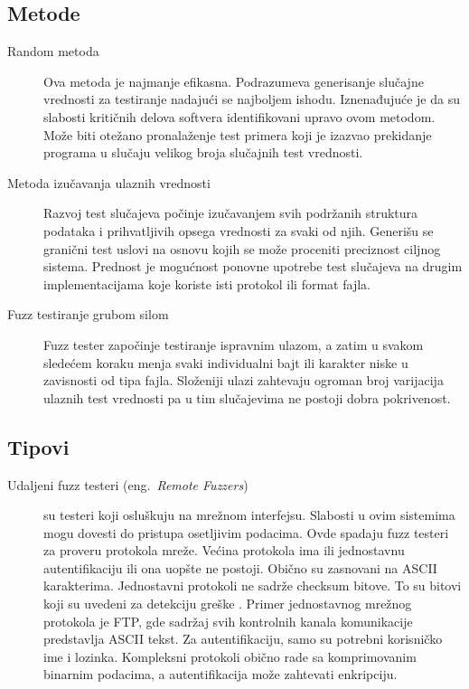 \documentclass[a4paper]{article}
\begin{document}
{\subsection{Metode}
\label{subsec:metode_fuzz_testiranja}
\begin{description}
\item[Random metoda]
Ova metoda je najmanje efikasna. Podrazumeva generisanje slučajne vrednosti za testiranje nadajući se najboljem ishodu. Iznenađujuće je da su slabosti kritičnih delova softvera identifikovani upravo ovom metodom. Može biti otežano pronalaženje test primera koji je izazvao prekidanje programa u slučaju velikog broja slučajnih test vrednosti. \\

\item[Metoda izučavanja ulaznih vrednosti] 
Razvoj test slučajeva počinje izučavanjem svih podržanih struktura podataka i prihvatljivih opsega vrednosti za svaki od njih. Generišu se granični test uslovi na osnovu kojih se može proceniti preciznost ciljnog sistema. Prednost je mogućnost ponovne upotrebe test slučajeva na drugim implementacijama koje koriste isti protokol ili format fajla.\\

\item[Fuzz testiranje grubom silom]
Fuzz tester započinje testiranje ispravnim ulazom, a zatim u svakom sledećem koraku menja svaki individualni bajt ili karakter niske u zavisnosti od tipa fajla. Složeniji ulazi zahtevaju ogroman broj varijacija ulaznih test vrednosti pa u tim slučajevima ne postoji dobra pokrivenost.
\end{description}

\subsection{Tipovi}
\label{subsec:tipovi_fuzz_testiranja}
\begin{description}
\item[Udaljeni fuzz testeri  (eng.~{\em Remote Fuzzers}) ] su testeri koji osluškuju na mrežnom interfejsu. Slabosti u ovim sistemima mogu dovesti do pristupa osetljivim podacima. Ovde spadaju fuzz testeri za proveru protokola mreže. Većina protokola ima ili jednostavnu autentifikaciju ili ona uopšte ne postoji. Obično su zasnovani na ASCII karakterima. Jednostavni protokoli ne sadrže checksum bitove. To su bitovi koji su uvedeni za detekciju greške \cite{tanenbaum}. Primer jednostavnog mrežnog protokola je FTP, gde sadržaj svih kontrolnih kanala komunikacije predstavlja ASCII tekst. Za autentifikaciju, samo su potrebni korisničko ime i lozinka. Kompleksni protokoli obično rade sa komprimovanim binarnim podacima, a autentifikacija može zahtevati enkripciju. \\


\end{description}}
\end{document}
